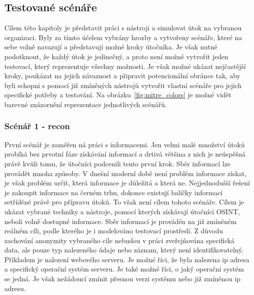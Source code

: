 \subsection{Testované scénáře}\label{subsec:testovane-scenare}
Cílem této kapitoly je představit práci s nástroji a simulovat útok na vybranou organizaci.
Byly za tímto účelem vybrány hrozby a vytvořeny scénáře, které na sebe volně navazují a představují možné kroky útočníka.
Je však nutné podotknout, že každý útok je jedinečný, a proto není možné vytvořit jeden testovací, který reprezentuje všechny možnosti.
Je však možné ukázat nejčastější kroky, poukázat na jejich návaznost a připravit potencionální obránce tak, aby byli schopni s pomocí již zmíněných nástrojů vytvořit vlastní scénáře pro jejich specifické potřeby a testování.
Na obrázku~\ref{fig:mitre_colors} je možné vidět barevné znázornění reprezentace jednotlivých scénářů.



\subsubsection{Scénář 1 - recon}%
První scénář je zaměřen ná práci s informacemi.
Jen velmi malé množství útoků probíhá bez prvotní fáze získávání informací a drtivá většina z nich je neúspěšná právě kvůli tomu, že útočníci podcenili tento první krok.
Sběr informací lze provádět mnoha způsoby.
V dnešní moderní době není problém informace získat, je však problém určit, která informace je důležitá a která ne.
Nejjednodušší řešení je zakoupit informace na černém trhu, dokonce existují balíčky informací setříděné právě pro přípravu útoků.
To však není cílem tohoto scénáře.
Cílem je ukázat vybrané techniky a nástroje, pomocí kterých získávají útočníci \ac{OSINT}, neboli volně dostupné informace.
Sběr informací je prováděn na již zmíněném reálném cíli, podle kterého je i modelováno testovací prostředí.
Z důvodu zachování anonymity vybraného cíle nebudou v práci zveřejňována specifická data, ale pouze typ nalezeného údaje nebo záznam, který není identifikovatelný.
Příkladem je nalezení webového serveru.
Je možné říci, že byla nalezena ip adresa a specifický operační systém serveru.
Je také možné říci, o jaký operační systém se jedná.
Je však nežádoucí zmínit přesnou verzi systému nebo již zmíněnou ip adresu.


